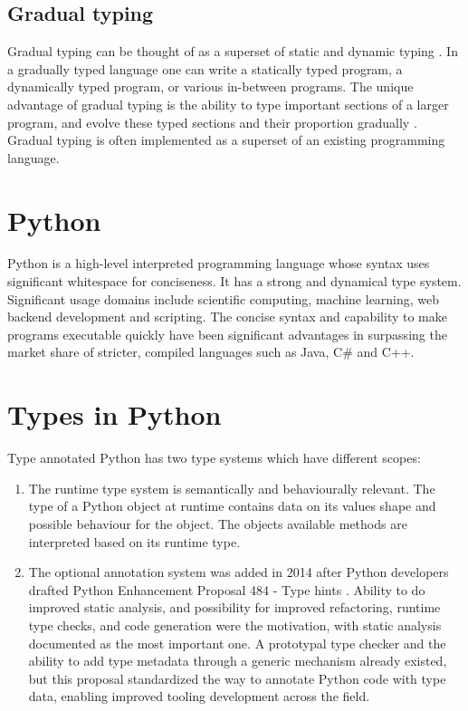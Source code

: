 \subsection{Gradual typing}
Gradual typing can be thought of as a superset of static and dynamic typing \cite{siek_refined_gradual_2015}. In a gradually typed language one can write a statically typed program, a dynamically typed program, or various in-between programs. The unique advantage of gradual typing is the ability to type important sections of a larger program, and evolve these typed sections and their proportion gradually \cite{siek_refined_gradual_2015}. Gradual typing is often implemented as a superset of an existing programming language.


\section{Python}
Python is a high-level interpreted programming language whose syntax uses significant whitespace for conciseness. It has a strong and dynamical type system. Significant usage domains include scientific computing, machine learning, web backend development and scripting. The concise syntax and capability to make programs executable quickly have been significant advantages in surpassing the market share of stricter, compiled languages such as Java, C\# and C++.


\section{Types in Python}

Type annotated Python has two type systems which have different scopes:
\begin{enumerate}
    \item The runtime type system is semantically and behaviourally relevant. The type of a Python object at runtime contains data on its values shape and possible behaviour for the object. The objects available methods are interpreted based on its runtime type.
    \item The optional annotation system was added in 2014 after Python developers drafted Python Enhancement Proposal 484 - Type hints \cite{pep_484}. Ability to do improved static analysis, and possibility for improved refactoring, runtime type checks, and code generation were the motivation, with static analysis documented as the most important one. A prototypal type checker and the ability to add type metadata through a generic mechanism already existed, but this proposal standardized the way to annotate Python code with type data, enabling improved tooling development across the field.
\end{enumerate}

